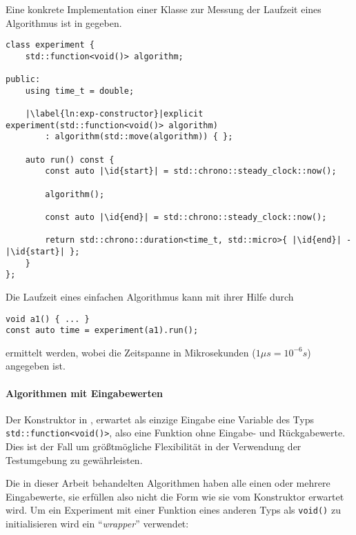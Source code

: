 Eine konkrete Implementation einer Klasse zur Messung der Laufzeit eines Algorithmus ist in  gegeben. 

\begin{lstlisting}[caption={Implementation einer Klasse zur Ermittlung der Laufzeit eines Algorithmus.}, label=lst:experiment]
class experiment {
	std::function<void()> algorithm;

public:
	using time_t = double;

	|\label{ln:exp-constructor}|explicit experiment(std::function<void()> algorithm)
		: algorithm(std::move(algorithm)) { };

	auto run() const {
		const auto |\id{start}| = std::chrono::steady_clock::now();

		algorithm();

		const auto |\id{end}| = std::chrono::steady_clock::now();

		return std::chrono::duration<time_t, std::micro>{ |\id{end}| - |\id{start}| };
	}
};
\end{lstlisting}

Die Laufzeit eines einfachen Algorithmus kann mit ihrer Hilfe durch
\begin{lstlisting}[numbers=none]
void a1() { ... }
const auto time = experiment(a1).run();
\end{lstlisting}
ermittelt werden, wobei die Zeitspanne in Mikrosekunden ($1\mu s = 10^{-6} s$) angegeben ist.

\paragraph{Algorithmen mit Eingabewerten} Der Konstruktor in ,  erwartet als einzige Eingabe eine Variable des Typs \lstinline{std::function<void()>}, also eine Funktion ohne Eingabe- und Rückgabewerte. Dies ist der Fall um größtmögliche Flexibilität in der Verwendung der Testumgebung zu gewährleisten.

Die in dieser Arbeit behandelten Algorithmen haben alle einen oder mehrere Eingabewerte, sie erfüllen also nicht die Form wie sie vom Konstruktor erwartet wird. Um ein Experiment mit einer Funktion eines anderen Typs als \lstinline{void()} zu initialisieren wird ein \enquote{\emph{wrapper}} verwendet:

